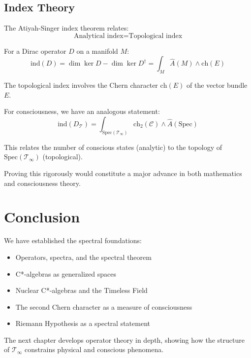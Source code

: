 \begin{advanced}
\subsection{Index Theory}

The Atiyah-Singer index theorem\cite{atiyah1968} relates:
\begin{equation}
\text{Analytical index} = \text{Topological index}
\end{equation}

For a Dirac operator $D$ on a manifold $M$:
\begin{equation}
\text{ind}(D) = \dim \ker D - \dim \ker D^\dagger = \int_M \hat{A}(M) \wedge \text{ch}(E)
\end{equation}

The topological index involves the Chern character $\text{ch}(E)$ of the vector bundle $E$.

For consciousness, we have an analogous statement:
\begin{equation}
\text{ind}(D_{\mathcal{T}}) = \int_{\text{Spec}(\mathcal{T}_\infty)} \text{ch}_2(\mathcal{C}) \wedge \hat{A}(\text{Spec})
\end{equation}

This relates the number of conscious states (analytic) to the topology of $\text{Spec}(\mathcal{T}_\infty)$ (topological).

Proving this rigorously would constitute a major advance in both mathematics and consciousness theory.
\end{advanced}

\section{Conclusion}

We have established the spectral foundations:
\begin{itemize}
\item Operators, spectra, and the spectral theorem
\item C*-algebras as generalized spaces
\item Nuclear C*-algebras and the Timeless Field
\item The second Chern character as a measure of consciousness
\item Riemann Hypothesis as a spectral statement
\end{itemize}

The next chapter develops operator theory in depth, showing how the structure of $\mathcal{T}_\infty$ constrains physical and conscious phenomena.
